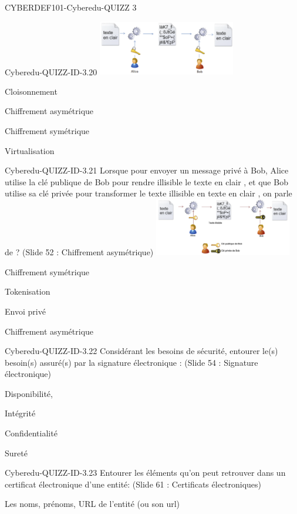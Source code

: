 \documentclass[12pt]{article}
\begin{document}
\begin{quiz}{CYBERDEF101-Cyberedu-QUIZZ 3}
\begin{multi}[multiple=true]{Cyberedu-QUIZZ-ID-3.20}
	\includegraphics[width=6cm]{img/img3-20}
\item Cloisonnement
\item Chiffrement asym\'etrique
\item* Chiffrement sym\'etrique
\item Virtualisation
 \end{multi}
\begin{multi}[multiple=true]{Cyberedu-QUIZZ-ID-3.21}
	Lorsque pour envoyer un message priv\'e \`{a} Bob, Alice utilise la cl\'e  publique de Bob pour rendre   illisible  le  texte en clair , et que Bob utilise sa cl\'e priv\'ee pour transformer le texte  illisible  en   texte en clair , on parle de ? (Slide 52 : Chiffrement asym\'etrique)
		\includegraphics[width=6cm]{img/img3-21}
\item Chiffrement sym\'etrique
\item Tokenisation
\item Envoi priv\'e
\item* Chiffrement asym\'etrique
\end{multi}
\begin{multi}[multiple=true]{Cyberedu-QUIZZ-ID-3.22}
	Consid\'erant les besoins de s\'ecurit\'e, entourer le(s) besoin(s) assur\'e(s) par la signature \'electronique : (Slide 54 : Signature \'electronique)
\item Disponibilit\'e,
\item* Int\'egrit\'e
\item Confidentialit\'e
\item Suret\'e
\end{multi}
\begin{multi}[multiple=true]{Cyberedu-QUIZZ-ID-3.23}
	Entourer les \'el\'ements qu'on peut retrouver dans un certificat \'electronique d'une entit\'e: (Slide 61 : Certificats \'electroniques)
\item* Les noms, pr\'enoms, URL de l'entit\'e (ou son url)

\end{multi}
\end{quiz}
\end{document}
